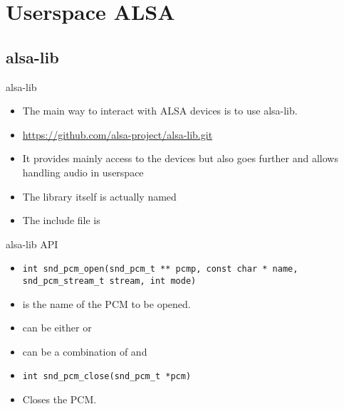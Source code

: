 \section{Userspace ALSA}

\subsection{alsa-lib}

\begin{frame}{alsa-lib}
  \begin{itemize}
  \item The main way to interact with ALSA devices is to use alsa-lib.
  \item \url{https://github.com/alsa-project/alsa-lib.git}
  \item It provides mainly access to the devices but also goes further
    and allows handling audio in userspace
  \item The library itself is actually named 
  \item The include file is 
  \end{itemize}
\end{frame}

\begin{frame}[fragile]{alsa-lib API}
  \begin{itemize}
  \item 
    \begin{block}{}
    \fontsize{9}{9}\selectfont
      \begin{verbatim}
int snd_pcm_open(snd_pcm_t ** pcmp, const char * name, snd_pcm_stream_t stream, int mode)
      \end{verbatim}
    \end{block}
  \item {} is the name of the PCM to be opened.
  \item {} can be either  or
  \item {} can be a combination of 
    and 
  \item 
    \begin{block}{}
    \fontsize{9}{9}\selectfont
      \begin{verbatim}
int snd_pcm_close(snd_pcm_t *pcm)
      \end{verbatim}
    \end{block}
  \item Closes the PCM.
  \end{itemize}
\end{frame}

